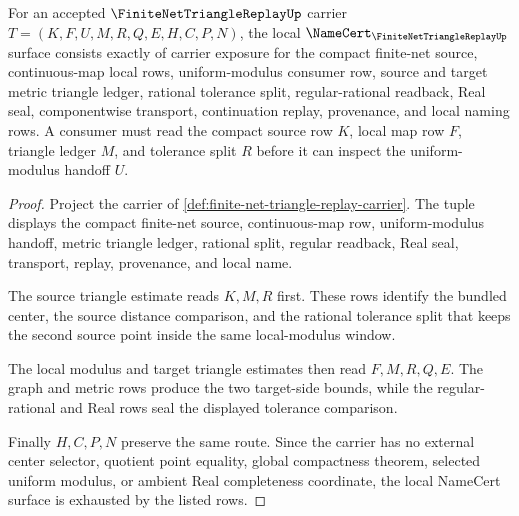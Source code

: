 \begin{theorem}
\label{thm:finite-net-triangle-replay-namecert-obligations}
For an accepted $\FiniteNetTriangleReplayUp$ carrier $T=(K,F,U,M,R,Q,E,H,C,P,N)$, the local $\NameCert_{\FiniteNetTriangleReplayUp}$ surface consists exactly of carrier exposure for the compact finite-net source, continuous-map local rows, uniform-modulus consumer row, source and target metric triangle ledger, rational tolerance split, regular-rational readback, Real seal, componentwise transport, continuation replay, provenance, and local naming rows. A consumer must read the compact source row $K$, local map row $F$, triangle ledger $M$, and tolerance split $R$ before it can inspect the uniform-modulus handoff $U$.
\end{theorem}
\begin{proof}
Project the carrier of \autoref{def:finite-net-triangle-replay-carrier}. The tuple displays the compact finite-net source, continuous-map row, uniform-modulus handoff, metric triangle ledger, rational split, regular readback, Real seal, transport, replay, provenance, and local name.

The source triangle estimate reads $K,M,R$ first. These rows identify the bundled center, the source distance comparison, and the rational tolerance split that keeps the second source point inside the same local-modulus window.

The local modulus and target triangle estimates then read $F,M,R,Q,E$. The graph and metric rows produce the two target-side bounds, while the regular-rational and Real rows seal the displayed tolerance comparison.

Finally $H,C,P,N$ preserve the same route. Since the carrier has no external center selector, quotient point equality, global compactness theorem, selected uniform modulus, or ambient Real completeness coordinate, the local NameCert surface is exhausted by the listed rows.
\end{proof}

